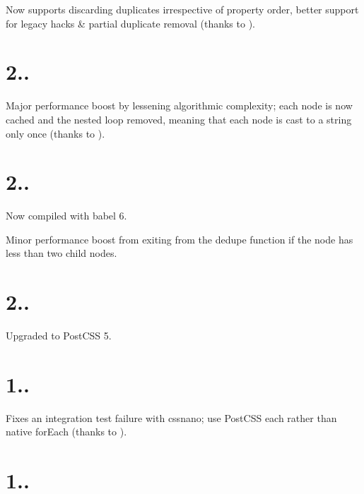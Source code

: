 
\begin{DoxyItemize}
\item Now supports discarding duplicates irrespective of property order, better support for legacy hacks \& partial duplicate removal (thanks to ).
\end{DoxyItemize}

\section*{2..}


\begin{DoxyItemize}
\item Major performance boost by lessening algorithmic complexity; each node is now cached and the nested loop removed, meaning that each node is cast to a string only once (thanks to ).
\end{DoxyItemize}

\section*{2..}


\begin{DoxyItemize}
\item Now compiled with babel 6.
\item Minor performance boost from exiting from the {\ttfamily dedupe} function if the node has less than two child nodes.
\end{DoxyItemize}

\section*{2..}


\begin{DoxyItemize}
\item Upgraded to Post\+C\+SS 5.
\end{DoxyItemize}

\section*{1..}


\begin{DoxyItemize}
\item Fixes an integration test failure with cssnano; use Post\+C\+SS {\ttfamily each} rather than native {\ttfamily for\+Each} (thanks to ).
\end{DoxyItemize}

\section*{1..}


